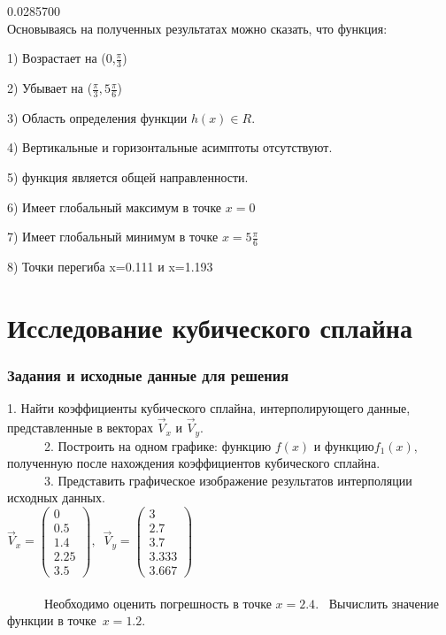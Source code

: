 \documentclass[russian,utf8,nocolumnxxxi,nocolumnxxxii]{eskdtext}
\begin{document}
    0.0285700 \\
    
Основываясь на полученных результатах можно сказать, что функция:

1) Возрастает на (0,$\frac{\pi}{3}$)

2) Убывает на ($\frac{\pi}{3},5\frac{\pi}{6}$)

3) Область определения функции $h(x) \in R$. 

4) Вертикальные и горизонтальные асимптоты отсутствуют.

5) функция является общей направленности.

6) Имеет глобальный максимум в точке $x=0$

7) Имеет глобальный минимум в точке $x=5\frac{\pi}{6}$

8) Точки перегиба x=0.111 и x=1.193

\newpage
\section{Исследование кубического сплайна}
\subsubsection{Задания и исходные данные для решения}
      $ $1. Найти коэффициенты кубического сплайна, интерполирующего данные, представленные в векторах$\,\,  {\vec{V}_x} \,\,$и$\,\, {\vec{V}_y.}$ \\
      $ {\,\,\,\,\,\,\,\,\,\,\,\,\,\,\,\,\,\,}$2. Построить на одном графике: функцию$\,\, {f(x)}\,\, $и$\,\,  функцию {f_1(x)}, $полученную после нахождения коэффициентов кубического сплайна.$ $ \\
      $ {\,\,\,\,\,\,\,\,\,\,\,\,\,\,\,\,\,\,}$3. Представить графическое изображение результатов интерполяции исходных данных$ $.\\

      $\vec{V}_x=\left(\begin{array}{c}0\\0.5\\1.4\\2.25\\3.5\end{array}\right),
      \,\,\,\vec{V}_y=\left(\begin{array}{c}3\\2.7\\3.7\\3.333\\3.667\end{array}\right)$ \\\\
      $ {\,\,\,\,\,\,\,\,\,\,\,\,\,\,\,\,\,\,}$Необходимо оценить погрешность в точке $ {x = 2.4}. $\,\,\,\,\,Вычислить значение функции в точке $\,{x = 1.2}.$\\
\newpage
\end{document}
